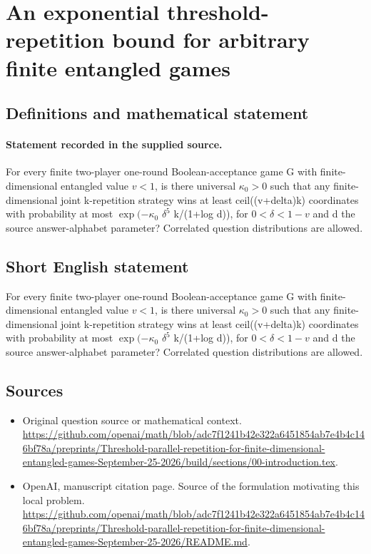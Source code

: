 \documentclass[11pt]{article}
\begin{document}
\section*{An exponential threshold-repetition bound for arbitrary finite entangled games}\label{statement}
\subsection{Definitions and mathematical statement}
\paragraph{Statement recorded in the supplied source.}
For every finite two-player one-round Boolean-acceptance game G with finite-dimensional entangled value $v<1$, is there universal $\kappa _0>0$ such that any finite-dimensional joint k-repetition strategy wins at least ceil((v+delta)k) coordinates with probability at most $\exp (-\kappa _0$ $\delta ^5$ k/(1+log d)), for $0<\delta <1-v$ and d the source answer-alphabet parameter? Correlated question distributions are allowed.
\subsection{Short English statement}
For every finite two-player one-round Boolean-acceptance game G with finite-dimensional entangled value $v<1$, is there universal $\kappa _0>0$ such that any finite-dimensional joint k-repetition strategy wins at least ceil((v+delta)k) coordinates with probability at most $\exp (-\kappa _0$ $\delta ^5$ k/(1+log d)), for $0<\delta <1-v$ and d the source answer-alphabet parameter? Correlated question distributions are allowed.
\subsection{Sources}
\begin{itemize}
\item[S1] Original question source or mathematical context.
\url{https://github.com/openai/math/blob/adc7f1241b42e322a6451854ab7e4b4c146bf78a/preprints/Threshold-parallel-repetition-for-finite-dimensional-entangled-games-September-25-2026/build/sections/00-introduction.tex}.
\item[S2] OpenAI, manuscript citation page. Source of the formulation motivating this local problem.
\url{https://github.com/openai/math/blob/adc7f1241b42e322a6451854ab7e4b4c146bf78a/preprints/Threshold-parallel-repetition-for-finite-dimensional-entangled-games-September-25-2026/README.md}.
\end{itemize}
\end{document}
